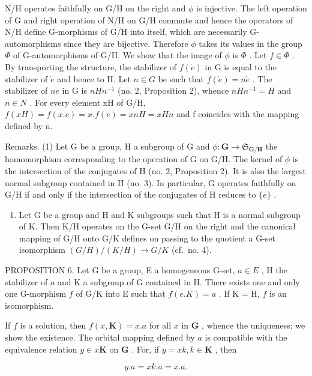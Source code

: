 N/H operates faithfully on G/H on the right and \(\phi\) is injective. The left operation of G and right operation of N/H on G/H commute and hence the operators of N/H define G-morphisms of G/H into itself, which are necessarily G-automorphisms since they are bijective. Therefore \(\phi\) takes its values in the group \(\Phi\) of G-automorphisms of G/H. We show that the image of \(\phi\) is \(\Phi\) . Let \(f \in \Phi\) . By transporting the structure, the stabilizer of \(f(\dot{e})\) in G is equal to the stabilizer of \(\dot{e}\) and hence to H. Let \(n \in G\) be such that \(f(\dot{e}) = n\dot{e}\) . The stabilizer of \(n\dot{e}\) in G is \(nHn^{-1}\) (no. 2, Proposition 2), whence \(nHn^{-1} = H\) and \(n \in N\) . For every element xH of G/H, \(f(xH) = f(x.\dot{e}) = x.f(\dot{e}) = xnH = xHn\) and f coincides with the mapping defined by n.

Remarks. (1) Let G be a group, H a subgroup of G and \(\phi: \mathbf{G} \to \mathfrak{S}_{\mathbf{G}/\mathbf{H}}\) the homomorphism corresponding to the operation of G on G/H. The kernel of \(\phi\) is the intersection of the conjugates of H (no. 2, Proposition 2). It is also the largest normal subgroup contained in H (no. 3). In particular, G operates faithfully on G/H if and only if the intersection of the conjugates of H reduces to \(\{e\}\) .

\begin{enumerate}
\def\labelenumi{(\arabic{enumi})}
\setcounter{enumi}{1}
\tightlist
\item
  Let G be a group and H and K subgroups such that H is a normal subgroup of K. Then K/H operates on the G-set G/H on the right and the canonical mapping of G/H onto G/K defines on passing to the quotient a G-set isomorphism \((G/H)/(K/H) \rightarrow G/K\) (cf.~no. 4).
\end{enumerate}

PROPOSITION 6. Let G be a group, E a homogeneous G-set, \(a \in E\) , H the stabilizer of \(a\) and K a subgroup of G contained in H. There exists one and only one G-morphism \(f\) of G/K into E such that \(f(e.K) = a\) . If K = H, \(f\) is an isomorphism.

If \(f\) is a solution, then \(f(x, \mathbf{K}) = x.a\) for all \(x\) in \(\mathbf{G}\) , whence the uniqueness; we show the existence. The orbital mapping defined by \(a\) is compatible with the equivalence relation \(y \in x\mathbf{K}\) on \(\mathbf{G}\) . For, if \(y = xk, k \in \mathbf{K}\) , then

\[
y. a = x k. a = x. a.
\]

